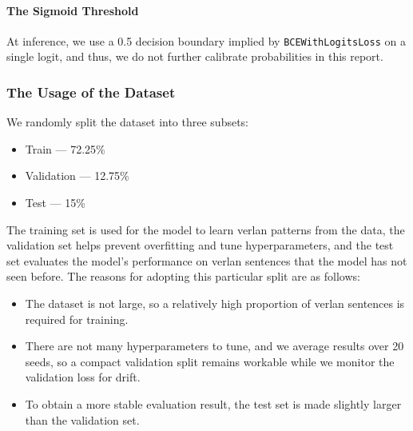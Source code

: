 \documentclass[12pt]{article}
\begin{document}


\paragraph{The Sigmoid Threshold}

At inference, we use a 0.5 decision boundary implied by \texttt{BCEWithLogitsLoss} on a single logit, and thus, we do not further calibrate probabilities in this report.

\subsubsection{The Usage of the Dataset}

We randomly split the dataset into three subsets:

\begin{itemize}
  \item Train --- 72.25\%
  \item Validation --- 12.75\%
  \item Test --- 15\%
\end{itemize}

The training set is used for the model to learn verlan patterns from the data, 
the validation set helps prevent overfitting and tune hyperparameters, 
and the test set evaluates the model's performance on verlan sentences that the model has not seen before.  
The reasons for adopting this particular split are as follows:

\begin{itemize}
  \item The dataset is not large, so a relatively high proportion of verlan sentences is required for training.
  \item There are not many hyperparameters to tune, and we average results over 20 seeds, so a compact validation split remains workable while we monitor the validation loss for drift.
  \item To obtain a more stable evaluation result, the test set is made slightly larger than the validation set.
\end{itemize}
\end{document}
